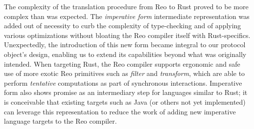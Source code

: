 The complexity of the translation procedure from Reo to Rust
proved to be more complex than was expected. The \textit{imperative form} intermediate representation was added out of necessity to curb the complexity of type-checking and of applying various optimizations without bloating the Reo compiler itself with Rust-specifics. Unexpectedly, the introduction of this new form became integral to our protocol object's design, enabling us to extend its capabilities beyond what was originally intended. When targeting Rust, the Reo compiler supports ergonomic and safe use of more exotic Reo primitives such as \textit{filter} and \textit{transform}, which are able to perform \textit{tentative} computations as part of synchronous interactions. Imperative form also shows promise as an intermediary step for languages similar to Rust; it is conceivable that existing targets such as Java (or others not yet implemented) can leverage this representation to reduce the work of adding new imperative language targets to the Reo compiler. 


